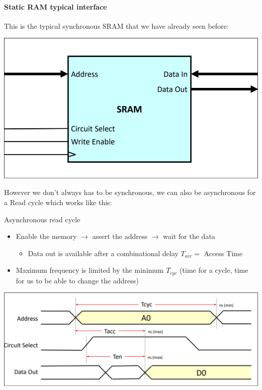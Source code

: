\paragraph{Static RAM typical interface}
This is the typical synchronous SRAM that we have already seen before:
\begin{center}
\includegraphics[scale=0.2]{screenshots/2025-10-12_4.png}
\end{center}
However we don't always has to be synchronous, we can also be asynchronous for a Read cycle which works like this:
\begin{parag}{Asynchronous read cycle}
    

\begin{itemize}
    \item Enable the memory $\to$ assert the address $\to $ wait for the data 
		\begin{itemize}
		    \item Data out is available after a combinational delay $T_{acc} = $ Access Time 
		\end{itemize}
		\item Maximum frequency is limited by the minimum $T_{cyc}$ (time for a cycle, time for us to be able to change the address)
\end{itemize}

\begin{center}
\includegraphics[scale=0.25]{screenshots/2025-10-12_6.png}
\end{center}

\end{parag}
